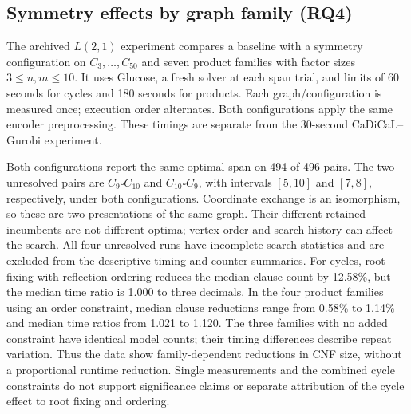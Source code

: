 \subsection{Symmetry effects by graph family (RQ4)}
\label{sec:symmetry-summary}
The archived $L(2,1)$ experiment compares a baseline with a symmetry
configuration on $C_3,\ldots,C_{50}$ and seven product families with
factor sizes $3\leq n,m\leq10$. It uses Glucose, a fresh solver at each
span trial, and limits of 60 seconds for cycles and 180 seconds for
products. Each graph/configuration is measured once; execution order
alternates. Both configurations apply the same encoder preprocessing.
These timings are separate from the 30-second CaDiCaL--Gurobi experiment.

\begin{table}[htbp]
\centering\small
\caption{Symmetry effects in the paired $L(2,1)$ experiment.}
\label{tab:compact-symmetry}

\end{table}

Both configurations report the same optimal span on 494 of 496 pairs.
The two unresolved pairs are $C_9\square C_{10}$ and
$C_{10}\square C_9$, with intervals $[5,10]$ and $[7,8]$, respectively,
under both configurations. Coordinate exchange is an isomorphism, so
these are two presentations of the same graph. Their different retained
incumbents are not different optima; vertex order and search history
can affect the search. All four unresolved runs have incomplete search
statistics and are excluded from the descriptive timing and counter
summaries. For cycles, root fixing with reflection ordering
reduces the median clause count by 12.58\%, but the median time ratio is
1.000 to three decimals. In the four product families using an order
constraint, median clause reductions range from 0.58\% to 1.14\% and
median time ratios from 1.021 to 1.120. The three families with no added
constraint have identical model counts; their timing differences describe
repeat variation. Thus the data show family-dependent reductions in CNF
size, without a proportional runtime reduction. Single measurements and
the combined cycle constraints do not support significance claims or
separate attribution of the cycle effect to root fixing and ordering.

